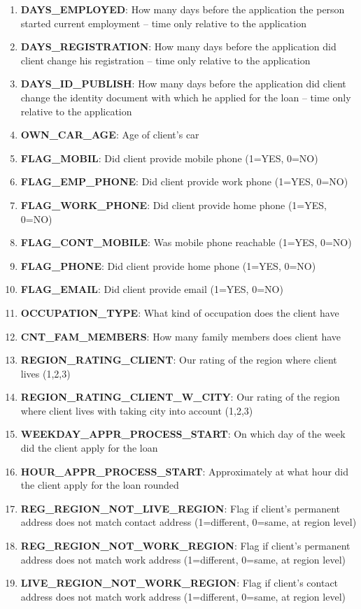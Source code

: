 \documentclass[12pt, letterpaper]{article}
\begin{document}
\begin{appendices}
\begin{enumerate}
  \item \textbf{DAYS_EMPLOYED}: How many days before the application the person started current employment -- time only relative to the application
  \item \textbf{DAYS_REGISTRATION}: How many days before the application did client change his registration -- time only relative to the application
  \item \textbf{DAYS_ID_PUBLISH}: How many days before the application did client change the identity document with which he applied for the loan -- time only relative to the application
  \item \textbf{OWN_CAR_AGE}: Age of client's car
  \item \textbf{FLAG_MOBIL}: Did client provide mobile phone (1=YES, 0=NO)
  \item \textbf{FLAG_EMP_PHONE}: Did client provide work phone (1=YES, 0=NO)
  \item \textbf{FLAG_WORK_PHONE}: Did client provide home phone (1=YES, 0=NO)
  \item \textbf{FLAG_CONT_MOBILE}: Was mobile phone reachable (1=YES, 0=NO)
  \item \textbf{FLAG_PHONE}: Did client provide home phone (1=YES, 0=NO)
  \item \textbf{FLAG_EMAIL}: Did client provide email (1=YES, 0=NO)
  \item \textbf{OCCUPATION_TYPE}: What kind of occupation does the client have
  \item \textbf{CNT_FAM_MEMBERS}: How many family members does client have
  \item \textbf{REGION_RATING_CLIENT}: Our rating of the region where client lives (1,2,3)
  \item \textbf{REGION_RATING_CLIENT_W_CITY}: Our rating of the region where client lives with taking city into account (1,2,3)
  \item \textbf{WEEKDAY_APPR_PROCESS_START}: On which day of the week did the client apply for the loan
  \item \textbf{HOUR_APPR_PROCESS_START}: Approximately at what hour did the client apply for the loan	rounded
  \item \textbf{REG_REGION_NOT_LIVE_REGION}: Flag if client's permanent address does not match contact address (1=different, 0=same, at region level)
  \item \textbf{REG_REGION_NOT_WORK_REGION}: Flag if client's permanent address does not match work address (1=different, 0=same, at region level)
  \item \textbf{LIVE_REGION_NOT_WORK_REGION}: Flag if client's contact address does not match work address (1=different, 0=same, at region level)

\end{enumerate}
\end{appendices}
\end{document}
